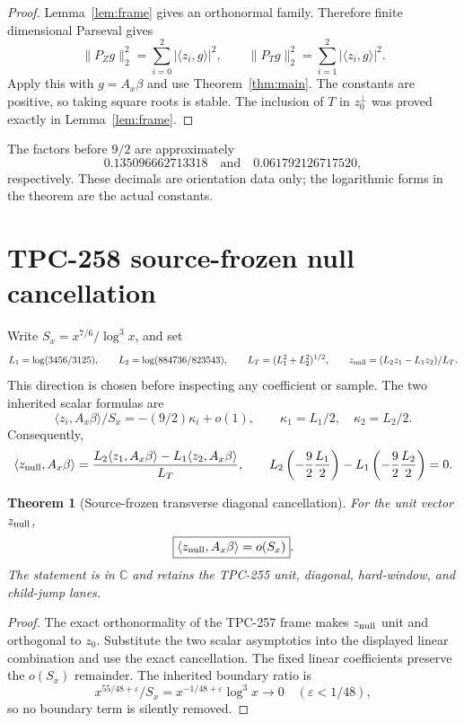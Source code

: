 \documentclass[10pt]{article}
\newtheorem{theorem}{Theorem}
\newcommand{\ip}[2]{\langle #1,#2\rangle}
\newcommand{\Ax}{A_x}
\newcommand{\e}{\varepsilon}
\begin{document}
\begin{proof}
Lemma~\ref{lem:frame} gives an orthonormal family.  Therefore finite
dimensional Parseval gives
\[
 \|P_Zg\|_2^2=\sum_{i=0}^2|\ip{z_i}{g}|^2,
 \qquad \|P_Tg\|_2^2=\sum_{i=1}^2|\ip{z_i}{g}|^2.
\]
Apply this with \(g=\Ax\beta\) and use Theorem~\ref{thm:main}.  The
constants are positive, so taking square roots is stable.  The inclusion of
\(T\) in \(z_0^\perp\) was proved exactly in Lemma~\ref{lem:frame}.
\end{proof}

The factors before \(9/2\) are approximately
\[
 0.135096662713318\quad\text{and}\quad0.061792126717520,
\]
respectively.  These decimals are orientation data only; the logarithmic
forms in the theorem are the actual constants.

\section{TPC-258 source-frozen null cancellation}

Write \(S_x=x^{7/6}/\log^3x\), and set
\[
 L_1=\log(3456/3125),\qquad L_2=\log(884736/823543),\qquad
 L_T=(L_1^2+L_2^2)^{1/2},\qquad
 z_{\rm null}=(L_2z_1-L_1z_2)/L_T.
\]
This direction is chosen before inspecting any coefficient or sample.  The
two inherited scalar formulas are
\[
 \ip{z_i}{\Ax\beta}/S_x=-(9/2)\kappa_i+o(1),\qquad
 \kappa_1=L_1/2,\quad \kappa_2=L_2/2.
\]
Consequently,
\[
 \ip{z_{\rm null}}{\Ax\beta}
 =\frac{L_2\ip{z_1}{\Ax\beta}-L_1\ip{z_2}{\Ax\beta}}{L_T},\qquad
 L_2\left(-\frac92\frac{L_1}{2}\right)
 -L_1\left(-\frac92\frac{L_2}{2}\right)=0.
\]

\begin{theorem}[Source-frozen transverse diagonal cancellation]\label{thm:null}
For the unit vector \(z_{\rm null}\),
\[
 \boxed{\ip{z_{\rm null}}{\Ax\beta}=o(S_x)}.
\]
The statement is in \(\mathbb C\) and retains the TPC-255 unit, diagonal,
hard-window, and child-jump lanes.
\end{theorem}

\begin{proof}
The exact orthonormality of the TPC-257 frame makes \(z_{\rm null}\) unit
and orthogonal to \(z_0\).  Substitute the two scalar asymptotics into the
displayed linear combination and use the exact cancellation.  The fixed
linear coefficients preserve the \(o(S_x)\) remainder.  The inherited
boundary ratio is
\[
 x^{55/48+\e}/S_x=x^{-1/48+\e}\log^3x\longrightarrow0
 \quad(\e<1/48),
\]
so no boundary term is silently removed.
\end{proof}
\end{document}

